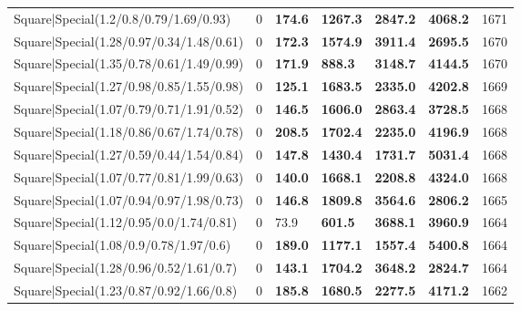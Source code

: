 \begin{tabular}{lrllllr}
 Square|Special(1.2/0.8/0.79/1.69/0.93)                        &             0   & \textbf{174.6} & \textbf{1267.3} & \textbf{2847.2} & \textbf{4068.2} &         1671 \\
 Square|Special(1.28/0.97/0.34/1.48/0.61)                      &             0   & \textbf{172.3} & \textbf{1574.9} & \textbf{3911.4} & \textbf{2695.5} &         1670 \\
 Square|Special(1.35/0.78/0.61/1.49/0.99)                      &             0   & \textbf{171.9} & \textbf{888.3}  & \textbf{3148.7} & \textbf{4144.5} &         1670 \\
 Square|Special(1.27/0.98/0.85/1.55/0.98)                      &             0   & \textbf{125.1} & \textbf{1683.5} & \textbf{2335.0} & \textbf{4202.8} &         1669 \\
 Square|Special(1.07/0.79/0.71/1.91/0.52)                      &             0   & \textbf{146.5} & \textbf{1606.0} & \textbf{2863.4} & \textbf{3728.5} &         1668 \\
 Square|Special(1.18/0.86/0.67/1.74/0.78)                      &             0   & \textbf{208.5} & \textbf{1702.4} & \textbf{2235.0} & \textbf{4196.9} &         1668 \\
 Square|Special(1.27/0.59/0.44/1.54/0.84)                      &             0   & \textbf{147.8} & \textbf{1430.4} & \textbf{1731.7} & \textbf{5031.4} &         1668 \\
 Square|Special(1.07/0.77/0.81/1.99/0.63)                      &             0   & \textbf{140.0} & \textbf{1668.1} & \textbf{2208.8} & \textbf{4324.0} &         1668 \\
 Square|Special(1.07/0.94/0.97/1.98/0.73)                      &             0   & \textbf{146.8} & \textbf{1809.8} & \textbf{3564.6} & \textbf{2806.2} &         1665 \\
 Square|Special(1.12/0.95/0.0/1.74/0.81)                       &             0   & 73.9           & \textbf{601.5}  & \textbf{3688.1} & \textbf{3960.9} &         1664 \\
 Square|Special(1.08/0.9/0.78/1.97/0.6)                        &             0   & \textbf{189.0} & \textbf{1177.1} & \textbf{1557.4} & \textbf{5400.8} &         1664 \\
 Square|Special(1.28/0.96/0.52/1.61/0.7)                       &             0   & \textbf{143.1} & \textbf{1704.2} & \textbf{3648.2} & \textbf{2824.7} &         1664 \\
 Square|Special(1.23/0.87/0.92/1.66/0.8)                       &             0   & \textbf{185.8} & \textbf{1680.5} & \textbf{2277.5} & \textbf{4171.2} &         1662 \\

\end{tabular}
